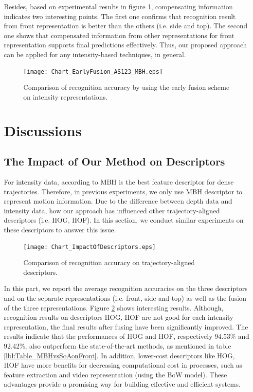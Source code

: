 \documentclass[review]{elsarticle}
\begin{document}
Besides, based on experimental results in figure \ref{lbl:Figure_EarlyFusion_AS123_MBH}, compensating information indicates two interesting points. The first one confirms that recognition result from front representation is better than the others (i.e. side and top). The second one shows that compensated information from other representations for front representation supports final predictions effectively. Thus, our proposed approach can be applied for any intensity-based techniques, in general.

\begin{figure}[H]
	\begin{center}
		\texttt{[image: Chart\_EarlyFusion\_AS123\_MBH.eps]}
	\end{center}
	\caption{\label{lbl:Figure_EarlyFusion_AS123_MBH}Comparison of recognition accuracy by using the early fusion scheme on intensity representations.}
\end{figure}

\section{Discussions}
\label{lbl:Discussions}

\subsection{The Impact of Our Method on Descriptors}

For intensity data, according to \cite{wang2011densetraj} MBH is the best feature descriptor for dense trajectories. Therefore, in previous experiments, we only use MBH descriptor to represent motion information. Due to the difference between depth data and intensity data, how our approach has influenced other trajectory-aligned descriptors (i.e. HOG, HOF). In this section, we conduct similar experiments on these descriptors to answer this issue.

\begin{figure}[H]
	\begin{center}
		\texttt{[image: Chart\_ImpactOfDescriptors.eps]}
	\end{center}
	\caption{\label{lbl:Figure_MBHHOGHOF}Comparison of recognition accuracy on trajectory-aligned descriptors.}
\end{figure}

In this part, we report the average recognition accuracies on the three descriptors and on the separate representations (i.e. front, side and top) as well as the fusion of the three representations. Figure \ref{lbl:Figure_MBHHOGHOF} shows interesting results. Although, recognition results on descriptors HOG, HOF are not good for each intensity representation, the final results after fusing have been significantly improved. The results indicate that the performances of HOG and HOF, respectively 94.53\% and 92.42\%, also outperform the state-of-the-art methods, as mentioned in table \ref{lbl:Table_MBHvsSoAonFront}. In addition, lower-cost descriptors like HOG, HOF have more benefits for decreasing computational cost in processes, such as feature extraction and video representation (using the BoW model). These advantages provide a promising way for building effective and efficient systems.
\end{document}
